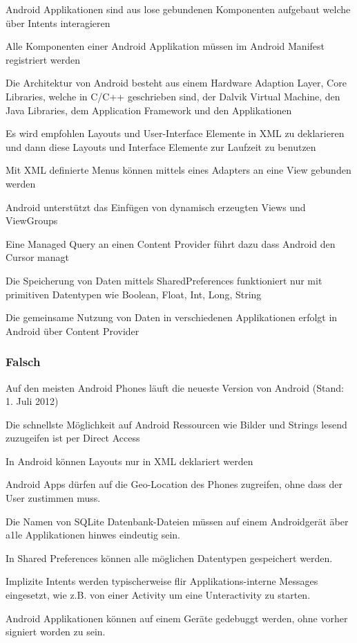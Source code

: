 Android Applikationen sind aus lose gebundenen Komponenten
aufgebaut welche über Intents interagieren

Alle Komponenten einer Android Applikation müssen im Android
Manifest registriert werden

Die Architektur von Android besteht aus einem Hardware
Adaption Layer, Core Libraries, welche in C/C++ geschrieben
sind, der Dalvik Virtual Machine, den Java Libraries, dem
Application Framework und den Applikationen

Es wird empfohlen Layouts und User-Interface Elemente in XML
zu deklarieren und dann diese Layouts und Interface Elemente
zur Laufzeit zu benutzen

Mit XML definierte Menus können mittels eines Adapters an eine
View gebunden werden

Android unterstützt das Einfügen von dynamisch erzeugten Views
und ViewGroups

Eine Managed Query an einen Content Provider führt dazu dass
Android den Cursor managt

Die Speicherung von Daten mittels SharedPreferences
funktioniert nur mit primitiven Datentypen wie Boolean, Float, Int,
Long, String

Die gemeinsame Nutzung von Daten in verschiedenen
Applikationen erfolgt in Android über Content Provider

\subsubsection{Falsch}
Auf den meisten Android Phones läuft die neueste Version von Android (Stand: 1.
Juli 2012)

Die schnellste Möglichkeit auf Android Ressourcen wie Bilder und Strings lesend
zuzugeifen ist per Direct Access

In Android können Layouts nur in XML deklariert werden

Android Apps dürfen auf die Geo-Location des Phones zugreifen, ohne dass der
User zustimmen muss.

Die Namen von SQLite Datenbank-Dateien müssen auf einem Androidgerät äber a1le
Applikationen hinwes eindeutig sein.

In Shared Preferences können alle möglichen Datentypen gespeichert werden.

Implizite Intents werden typischerweise flir Applikations-interne Messages
eingesetzt, wie z.B. von einer Activity um eine Unteractivity zu starten.

Android Applikationen können auf einem Geräte gedebuggt werden, ohne vorher
signiert worden zu sein.

